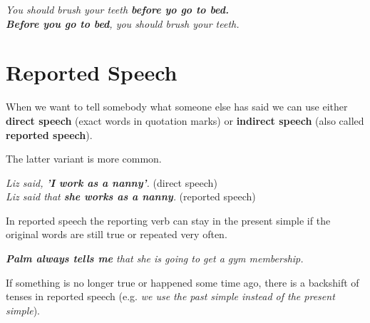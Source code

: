 \documentclass[hidelinks,10pt,a4paper]{article}
\begin{document}
\begin{center}
	\textit{You should brush your teeth \textbf{before yo go to bed.}}\\
	\textit{\textbf{Before you go to bed}, you should brush your teeth. }
\end{center}

\section{Reported Speech}
When we want to tell somebody what someone else has said we can use either \textbf{direct speech} (exact words in quotation marks) or \textbf{indirect speech} (also called \textbf{reported speech}).

The latter variant is more common.

\begin{center}
	\textit{Liz said, \textbf{'I work as a nanny'}.} (direct speech)\\
	\textit{Liz said that \textbf{she works as a nanny}.} (reported speech)
\end{center}

In reported speech the reporting verb can stay in the present simple if the original words are still true or repeated very often.

\begin{center}
	\textit{\textbf{Palm always tells me} that she is going to get a gym membership.}
\end{center}

If something is no longer true or happened some time ago, there is a backshift of tenses in reported speech (e.g. \textit{we use the past simple instead of the present simple}).
\end{document}
